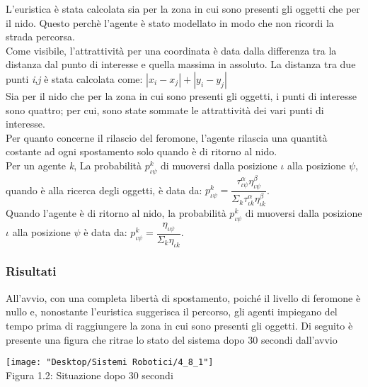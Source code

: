 \documentclass[12pt,a4paper,openright,twoside]{report}
\begin{document}
L'euristica è stata calcolata sia per la zona in cui sono presenti gli oggetti che per il nido. Questo perchè l'agente è stato modellato in modo che non ricordi la strada percorsa.\\
Come visibile, l'attrattività per una coordinata è data dalla differenza tra la distanza dal punto di interesse e quella massima in assoluto. La distanza tra due punti \textit{i},\textit{j} è stata calcolata come: $|x_i-x_j|+|y_i-y_j|$\\
Sia per il nido che per la zona in cui sono presenti gli oggetti, i punti di interesse sono quattro; per cui, sono state sommate le attrattività dei vari punti di interesse.\\
Per quanto concerne il rilascio del feromone, l'agente rilascia una quantità costante ad ogni spostamento solo quando è di ritorno al nido. \\
Per un agente \textit{k}, La probabilità $p^k_{\iota\psi}$  di muoversi dalla posizione $\iota$ alla posizione $\psi$, quando è alla ricerca degli oggetti, è data da: $p^k_{\iota\psi}= \dfrac{\tau^\alpha_{\iota\psi}\eta^\beta_{\iota\psi}}{\Sigma_k\tau^\alpha_{\iota k}\eta^\beta_{\iota k}}$. \\
Quando l'agente è di ritorno al nido, la probabilità  $p^k_{\iota\psi}$ di muoversi dalla posizione $\iota$ alla posizione $\psi$ è data da: $p^k_{\iota\psi}= \dfrac{\eta_{\iota\psi}}{\Sigma_k\eta_{\iota k}}$.

\subsubsection{Risultati}

All'avvio, con una completa libertà di spostamento, poiché il livello di feromone è nullo e, nonostante l'euristica suggerisca il percorso, gli agenti impiegano del tempo prima di raggiungere la zona in cui sono presenti gli oggetti. %
Di seguito è presente una figura che ritrae lo stato del sistema dopo 30 secondi dall'avvio

\begin{center}  
	\texttt{[image: "Desktop/Sistemi Robotici/4\_8\_1"]}
	\\Figura 1.2: Situazione dopo 30 secondi
\end{center}
\end{document}
